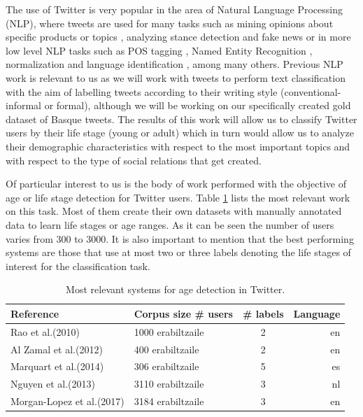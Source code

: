 \documentclass[information,article,submit,moreauthors,pdftex,10pt,a4paper]{Definitions/mdpi}
\begin{document}
The use of Twitter is very popular in the area of Natural Language Processing (NLP), where tweets are used for many tasks such as mining opinions about specific products or topics \cite{rosenthal2017semeval,villena2013tass}, analyzing stance detection and fake news \cite{S16-1003,zubiaga2017stance} or in more low level NLP tasks such as POS tagging \cite{ritter_named_2011}, Named Entity Recognition \cite{baldwin2015shared}, normalization \cite{alegria2015tweetnorm} and language identification \cite{zubiaga2016tweetlid}, among many others. Previous NLP work is relevant to us as we will work with tweets to perform text classification with the aim of labelling tweets according to their writing style (conventional-informal or formal), although we will be working on our specifically created gold dataset of Basque tweets. The results of this work will allow us to classify Twitter users by their life stage (young or adult) which in turn would allow us to analyze their demographic characteristics with respect to the most important topics and with respect to the type of social relations that get created.

Of particular interest to us is the body of work performed with the objective of age or life stage detection for Twitter users. Table \ref{tab:arte ezaug} lists the most relevant work on this task. Most of them create their own datasets with manually annotated data to learn life stages or age ranges. As it can be seen the number of users varies from 300 to 3000. It is also important to mention that the best performing systems are those that use at most two  \cite{rao2010classifying,al2012homophily} or three \cite{nguyen2013old,morgan2017predicting} labels denoting the life stages of interest for the classification task.

\begin{table}[H]
  \centering
  \begin{tabular}{llcr}\hline
    Reference & Corpus size \# users & \# labels & Language \\ \hline \hline
    Rao et al.(2010) & 1000 erabiltzaile & 2 & en \\
    Al Zamal et al.(2012) & 400 erabiltzaile & 2 & en \\
    Marquart et al.(2014) & 306 erabiltzaile & 5 & es \\
    Nguyen et al.(2013) & 3110 erabiltzaile & 3 & nl \\
    Morgan-Lopez et al.(2017) & 3184 erabiltzaile & 3 & en \\ \hline
  \end{tabular}
  \caption{Most relevant systems for age detection in Twitter.}
  \label{tab:arte ezaug}
\end{table}
\end{document}
